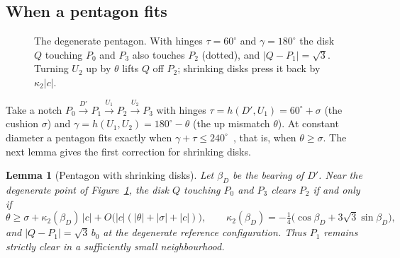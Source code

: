 \documentclass[11pt]{amsart}
\newtheorem{lemma}{Lemma}[section]
\theoremstyle{definition}
\begin{document}
\subsection{When a pentagon fits}
\begin{figure}[t]
\centering
{}
\caption{The degenerate pentagon. With hinges $\tau=60^\circ$ and $\gamma=180^\circ$ the disk $Q$
touching $P_0$ and $P_3$ also touches $P_2$ (dotted), and $|Q-P_1|=\sqrt3$. Turning $U_2$ up by $\theta$
lifts $Q$ off $P_2$; shrinking disks press it back by $\kappa_2|c|$.}\label{fig:pent}
\end{figure}

Take a notch $P_0\xrightarrow{D'}P_1\xrightarrow{U_1}P_2\xrightarrow{U_2}P_3$ with hinges
$\tau=h(D',U_1)=60^\circ+\sigma$ (the cushion $\sigma$) and $\gamma=h(U_1,U_2)=180^\circ-\theta$ (the up mismatch
$\theta$). At constant diameter a pentagon fits exactly when $\gamma+\tau\le240^\circ$~\cite[Prop.~4.3]{GD},
that is, when $\theta\ge\sigma$. The next lemma gives the first correction for shrinking disks.

\begin{lemma}[Pentagon with shrinking disks]\label{lem:pent}
Let $\beta_D$ be the bearing of $D'$. Near the degenerate point of Figure~\ref{fig:pent}, the disk $Q$
touching $P_0$ and $P_3$ clears $P_2$ if and only if
\[
\theta\ge\sigma+\kappa_2(\beta_D)\,|c|+O\bigl(|c|(|\theta|+|\sigma|+|c|)\bigr),\qquad
\kappa_2(\beta_D)=-\tfrac14\bigl(\cos\beta_D+3\sqrt3\sin\beta_D\bigr),
\]
and $|Q-P_1|=\sqrt3\,b_0$ at the degenerate reference configuration. Thus $P_1$
remains strictly clear in a sufficiently small neighbourhood.
\end{lemma}
\end{document}
